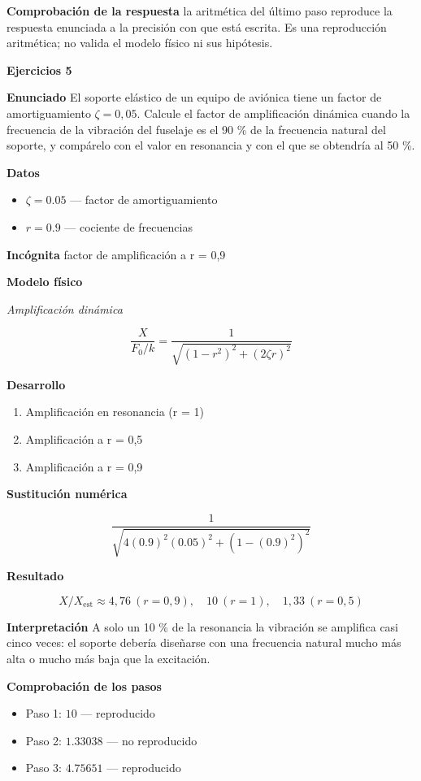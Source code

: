 \documentclass[10pt,openany]{book}
\begin{document}
\noindent\textbf{Comprobación de la respuesta} la aritmética del último paso reproduce la respuesta enunciada a la precisión con que está escrita. Es una reproducción aritmética; no valida el modelo físico ni sus hipótesis.

\noindent\textbf{Ejercicios 5}

\noindent\textbf{Enunciado}
El soporte elástico de un equipo de aviónica tiene un factor de amortiguamiento \(\zeta = 0{,}05\). Calcule el factor de amplificación dinámica cuando la frecuencia de la vibración del fuselaje es el 90 \% de la frecuencia natural del soporte, y compárelo con el valor en resonancia y con el que se obtendría al 50 \%.

\noindent\textbf{Datos}
\begin{itemize}
\item $\zeta = 0.05$ — factor de amortiguamiento
\item $r = 0.9$ — cociente de frecuencias
\end{itemize}

\noindent\textbf{Incógnita}
factor de amplificación a r = 0,9

\noindent\textbf{Modelo físico}

\noindent\textit{Amplificación dinámica}

\[
\frac{X}{F_0/k} = \frac{1}{\sqrt{(1 - r^{2})^{2} + (2\zeta r)^{2}}}
\]

\noindent\textbf{Desarrollo}
\begin{enumerate}
\item
Amplificación en resonancia (r = 1)
\item
Amplificación a r = 0,5
\item
Amplificación a r = 0,9
\end{enumerate}

\noindent\textbf{Sustitución numérica}

\[
\frac{1}{\sqrt{4 \left(0.9\right)^{2} \left(0.05\right)^{2} + \left(1 - \left(0.9\right)^{2}\right)^{2}}}
\]

\noindent\textbf{Resultado}

\[
X/X_{\mathrm{est}} \approx 4{,}76\ (r = 0{,}9),\quad 10\ (r = 1),\quad 1{,}33\ (r = 0{,}5)
\]

\noindent\textbf{Interpretación}
A solo un 10 \% de la resonancia la vibración se amplifica casi cinco veces: el soporte debería diseñarse con una frecuencia natural mucho más alta o mucho más baja que la excitación.

\noindent\textbf{Comprobación de los pasos}
\begin{itemize}
\item Paso 1: $10$ — reproducido
\item Paso 2: $1.33038$ — no reproducido
\item Paso 3: $4.75651$ — reproducido
\end{itemize}
\end{document}
